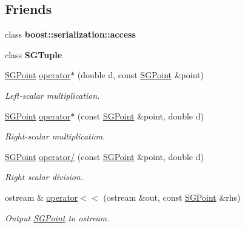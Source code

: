 \subsection*{Friends}
\begin{DoxyCompactItemize}
\item 
\hypertarget{classSGPoint_ac98d07dd8f7b70e16ccb9a01abf56b9c}{class {\bfseries boost\-::serialization\-::access}}\label{classSGPoint_ac98d07dd8f7b70e16ccb9a01abf56b9c}

\item 
\hypertarget{classSGPoint_ad5f2d71f9c5e1cbf3ba9ed5ae3de7798}{class {\bfseries S\-G\-Tuple}}\label{classSGPoint_ad5f2d71f9c5e1cbf3ba9ed5ae3de7798}

\item 
\hypertarget{classSGPoint_a3c878d936b6e5255b1b1b8aedc61e86b}{\hyperlink{classSGPoint}{S\-G\-Point} \hyperlink{classSGPoint_a3c878d936b6e5255b1b1b8aedc61e86b}{operator$\ast$} (double d, const \hyperlink{classSGPoint}{S\-G\-Point} \&point)}\label{classSGPoint_a3c878d936b6e5255b1b1b8aedc61e86b}

\begin{DoxyCompactList}\small\item\em Left-\/scalar multiplication. \end{DoxyCompactList}\item 
\hypertarget{classSGPoint_a6744606b8f8713122dd7a1cf322f9af1}{\hyperlink{classSGPoint}{S\-G\-Point} \hyperlink{classSGPoint_a6744606b8f8713122dd7a1cf322f9af1}{operator$\ast$} (const \hyperlink{classSGPoint}{S\-G\-Point} \&point, double d)}\label{classSGPoint_a6744606b8f8713122dd7a1cf322f9af1}

\begin{DoxyCompactList}\small\item\em Right-\/scalar multiplication. \end{DoxyCompactList}\item 
\hypertarget{classSGPoint_ad112619c55afac0b026c236a9901e001}{\hyperlink{classSGPoint}{S\-G\-Point} \hyperlink{classSGPoint_ad112619c55afac0b026c236a9901e001}{operator/} (const \hyperlink{classSGPoint}{S\-G\-Point} \&point, double d)}\label{classSGPoint_ad112619c55afac0b026c236a9901e001}

\begin{DoxyCompactList}\small\item\em Right scalar division. \end{DoxyCompactList}\item 
\hypertarget{classSGPoint_a574625ffb8acdf3d4fbd94e9c8bac123}{ostream \& \hyperlink{classSGPoint_a574625ffb8acdf3d4fbd94e9c8bac123}{operator$<$$<$} (ostream \&out, const \hyperlink{classSGPoint}{S\-G\-Point} \&rhs)}\label{classSGPoint_a574625ffb8acdf3d4fbd94e9c8bac123}

\begin{DoxyCompactList}\small\item\em Output \hyperlink{classSGPoint}{S\-G\-Point} to ostream. \end{DoxyCompactList}\end{DoxyCompactItemize}


